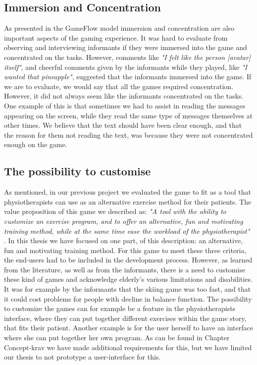 \subsection{Immersion and Concentration}
As presented in the GameFlow model immersion and concentration are also important aspects of the gaming experience. It was hard to evaluate from observing and interviewing informants if they were immersed into the game and concentrated on the tasks. However, comments like \emph{"I felt like the person [avatar] itself"}, and cheerful comments given by the informants while they played, like \emph{"I wanted that pineapple"}, suggested that the informants immersed into the game. If we are to evaluate, we would say that all the games required concentration. However, it did not always seem like the informants concentrated on the tasks. One example of this is that sometimes we had to assist in reading the messages appearing on the screen, while they read the same type of messages themselves at other times. We believe that the text should have been clear enough, and that the reason for them not reading the text, was because they were not concentrated enough on the game. 


\subsection{The possibility to customise}
As mentioned, in our previous project \cite{project} we evaluated the game to fit as a tool that physiotherapists can use as an alternative exercise method for their patients. The value proposition of this game we described as: \emph{"A tool with the ability to customize an exercise program, and to offer an alternative, fun and motivating training method, while at the same time ease the workload of the physiotherapist"} \cite{project}. In this thesis we have focused on one part, of this description: an alternative, fun and motivating training method. For this game to meet these three criteria, the end-users had to be included in the development process. However, as learned from the literature, as well as from the informants, there is a need to customise these kind of games and acknowledge elderly's various limitations and disabilities. It was for example by the informants that the skiing game was too fast, and that it could cost problems for people with decline in balance function. The possibility to customize the games can for example be a feature in the physiotherapists interface, where they can put together different exercises within the game story, that fits their patient. Another example is for the user herself to have an interface where she can put together her own program.  As can be found in Chapter Concept-krav we have made additional requirements for this, but we have limited our thesis to not prototype a user-interface for this. 

